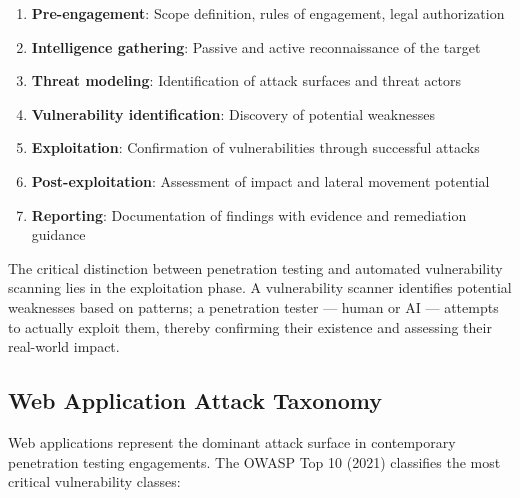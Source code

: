 \documentclass[12pt,a4paper,oneside,openany]{book}
\begin{document}
\begin{definitionbox}
\begin{enumerate}
\item \textbf{Pre-engagement}: Scope definition, rules of engagement, legal authorization
\item \textbf{Intelligence gathering}: Passive and active reconnaissance of the target
\item \textbf{Threat modeling}: Identification of attack surfaces and threat actors
\item \textbf{Vulnerability identification}: Discovery of potential weaknesses
\item \textbf{Exploitation}: Confirmation of vulnerabilities through successful attacks
\item \textbf{Post-exploitation}: Assessment of impact and lateral movement potential
\item \textbf{Reporting}: Documentation of findings with evidence and remediation guidance
\end{enumerate}
\end{definitionbox}

The critical distinction between penetration testing and automated vulnerability scanning lies in the exploitation phase. A vulnerability scanner identifies potential weaknesses based on patterns; a penetration tester — human or AI — attempts to actually exploit them, thereby confirming their existence and assessing their real-world impact.

\subsection{Web Application Attack Taxonomy}

Web applications represent the dominant attack surface in contemporary penetration testing engagements. The OWASP Top 10 (2021) \cite{owasptop10} classifies the most critical vulnerability classes:
\end{document}
